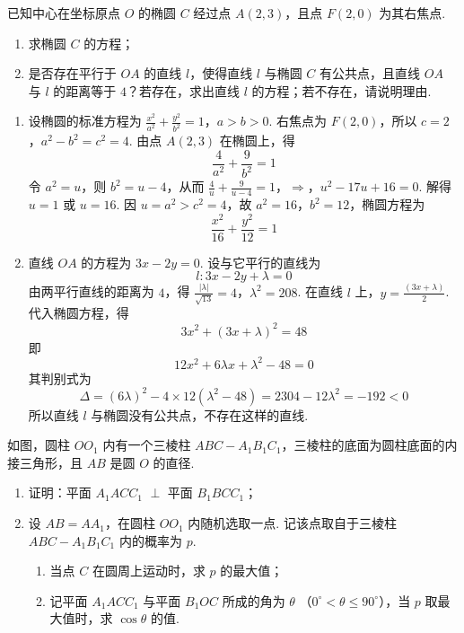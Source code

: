 \begin{problem}
已知中心在坐标原点 \(O\) 的椭圆 \(C\) 经过点 \(A(2,3)\)，且点 \(F(2,0)\) 为其右焦点.
\begin{enumerate}
\item 求椭圆 \(C\) 的方程；
\item 是否存在平行于 \(OA\) 的直线 \(l\)，使得直线 \(l\) 与椭圆 \(C\) 有公共点，且直线 \(OA\) 与 \(l\) 的距离等于 \(4\)？若存在，求出直线 \(l\) 的方程；若不存在，请说明理由.
\end{enumerate}
\end{problem}

\begin{solution}
\begin{enumerate}
\item 设椭圆的标准方程为
\(\frac{x^{2}}{a^{2}}+\frac{y^{2}}{b^{2}}=1\)，\(a>b>0\).
右焦点为 \(F(2,0)\)，所以 \(c=2\)，\(a^{2}-b^{2}=c^{2}=4\). 由点 \(A(2,3)\) 在椭圆上，得
\[
\frac{4}{a^{2}}+\frac{9}{b^{2}}=1
\]
令 \(a^{2}=u\)，则 \(b^{2}=u-4\)，从而
\(\frac4u+\frac9{u-4}=1\)，\(\Longrightarrow\)，\(u^{2}-17u+16=0\).
解得 \(u=1\) 或 \(u=16\). 因 \(u=a^{2}>c^{2}=4\)，故 \(a^{2}=16\)，\(b^{2}=12\)，椭圆方程为
\[
\frac{x^{2}}{16}+\frac{y^{2}}{12}=1
\]

\item 直线 \(OA\) 的方程为 \(3x-2y=0\). 设与它平行的直线为
\[
l:3x-2y+\lambda=0
\]
由两平行直线的距离为 \(4\)，得
\(\frac{|\lambda|}{\sqrt{13}}=4\)，\(\lambda^{2}=208\).
在直线 \(l\) 上，\(y=\frac{(3x+\lambda)}{2}\). 代入椭圆方程，得
\[
3x^{2}+(3x+\lambda)^{2}=48
\]
即
\[
12x^{2}+6\lambda x+\lambda^{2}-48=0
\]
其判别式为
\[
\Delta=(6\lambda)^{2}-4\times12(\lambda^{2}-48)=2304-12\lambda^{2}=-192<0
\]
所以直线 \(l\) 与椭圆没有公共点，不存在这样的直线.
\end{enumerate}
\end{solution}

\begin{problem}
如图，圆柱 \(O O_{1}\) 内有一个三棱柱 \(A B C - A_{1}B_{1}C_{1}\)，三棱柱的底面为圆柱底面的内接三角形，且 \(A B\) 是圆 \(O\) 的直径.

\begin{enumerate}
\item 证明：平面 \(A_{1}ACC_{1}\) \(\perp\) 平面 \(B_{1}BCC_{1}\)；
\item 设 \(AB = AA_{1}\)，在圆柱 \(OO_{1}\) 内随机选取一点. 记该点取自于三棱柱 \(ABC - A_{1}B_{1}C_{1}\) 内的概率为 \(p\).
\begin{enumerate}
\item 当点 \(C\) 在圆周上运动时，求 \(p\) 的最大值；
\item 记平面 \(A_{1}ACC_{1}\) 与平面 \(B_{1}OC\) 所成的角为 \(\theta\) （\(0^{\circ} < \theta \leqslant 90^{\circ}\)），当 \(p\) 取最大值时，求 \(\cos \theta\) 的值.
\end{enumerate}
\end{enumerate}

\end{problem}

